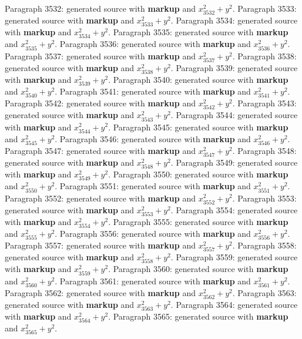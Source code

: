 \documentclass{article}
\begin{document}
Paragraph 3532: generated source with \textbf{markup} and $x_{3532}^2 + y^2$.
Paragraph 3533: generated source with \textbf{markup} and $x_{3533}^2 + y^2$.
Paragraph 3534: generated source with \textbf{markup} and $x_{3534}^2 + y^2$.
Paragraph 3535: generated source with \textbf{markup} and $x_{3535}^2 + y^2$.
Paragraph 3536: generated source with \textbf{markup} and $x_{3536}^2 + y^2$.
Paragraph 3537: generated source with \textbf{markup} and $x_{3537}^2 + y^2$.
Paragraph 3538: generated source with \textbf{markup} and $x_{3538}^2 + y^2$.
Paragraph 3539: generated source with \textbf{markup} and $x_{3539}^2 + y^2$.
Paragraph 3540: generated source with \textbf{markup} and $x_{3540}^2 + y^2$.
Paragraph 3541: generated source with \textbf{markup} and $x_{3541}^2 + y^2$.
Paragraph 3542: generated source with \textbf{markup} and $x_{3542}^2 + y^2$.
Paragraph 3543: generated source with \textbf{markup} and $x_{3543}^2 + y^2$.
Paragraph 3544: generated source with \textbf{markup} and $x_{3544}^2 + y^2$.
Paragraph 3545: generated source with \textbf{markup} and $x_{3545}^2 + y^2$.
Paragraph 3546: generated source with \textbf{markup} and $x_{3546}^2 + y^2$.
Paragraph 3547: generated source with \textbf{markup} and $x_{3547}^2 + y^2$.
Paragraph 3548: generated source with \textbf{markup} and $x_{3548}^2 + y^2$.
Paragraph 3549: generated source with \textbf{markup} and $x_{3549}^2 + y^2$.
Paragraph 3550: generated source with \textbf{markup} and $x_{3550}^2 + y^2$.
Paragraph 3551: generated source with \textbf{markup} and $x_{3551}^2 + y^2$.
Paragraph 3552: generated source with \textbf{markup} and $x_{3552}^2 + y^2$.
Paragraph 3553: generated source with \textbf{markup} and $x_{3553}^2 + y^2$.
Paragraph 3554: generated source with \textbf{markup} and $x_{3554}^2 + y^2$.
Paragraph 3555: generated source with \textbf{markup} and $x_{3555}^2 + y^2$.
Paragraph 3556: generated source with \textbf{markup} and $x_{3556}^2 + y^2$.
Paragraph 3557: generated source with \textbf{markup} and $x_{3557}^2 + y^2$.
Paragraph 3558: generated source with \textbf{markup} and $x_{3558}^2 + y^2$.
Paragraph 3559: generated source with \textbf{markup} and $x_{3559}^2 + y^2$.
Paragraph 3560: generated source with \textbf{markup} and $x_{3560}^2 + y^2$.
Paragraph 3561: generated source with \textbf{markup} and $x_{3561}^2 + y^2$.
Paragraph 3562: generated source with \textbf{markup} and $x_{3562}^2 + y^2$.
Paragraph 3563: generated source with \textbf{markup} and $x_{3563}^2 + y^2$.
Paragraph 3564: generated source with \textbf{markup} and $x_{3564}^2 + y^2$.
Paragraph 3565: generated source with \textbf{markup} and $x_{3565}^2 + y^2$.
\end{document}
